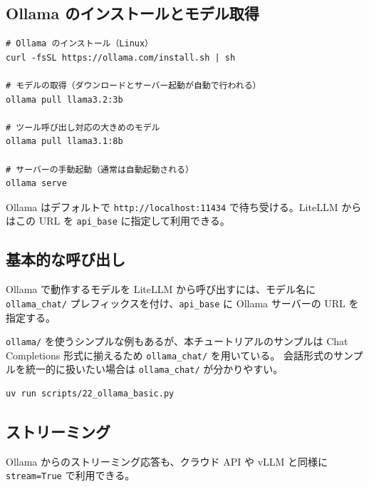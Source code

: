\documentclass[a4paper,11pt]{ltjsarticle}
\newcommand{\code}[1]{\texttt{#1}}
\begin{document}
\subsection{Ollama のインストールとモデル取得}

\begin{lstlisting}[style=bash]
# Ollama のインストール（Linux）
curl -fsSL https://ollama.com/install.sh | sh

# モデルの取得（ダウンロードとサーバー起動が自動で行われる）
ollama pull llama3.2:3b

# ツール呼び出し対応の大きめのモデル
ollama pull llama3.1:8b

# サーバーの手動起動（通常は自動起動される）
ollama serve
\end{lstlisting}

Ollama はデフォルトで \code{http://localhost:11434} で待ち受ける。LiteLLM からはこの URL を \code{api\_base} に指定して利用できる。

\subsection{基本的な呼び出し}
\label{subsec:ollama_basic}

Ollama で動作するモデルを LiteLLM から呼び出すには、モデル名に \code{ollama\_chat/} プレフィックスを付け、\code{api\_base} に Ollama サーバーの URL を指定する。



\begin{notebox}
\code{ollama/} を使うシンプルな例もあるが、本チュートリアルのサンプルは Chat Completions 形式に揃えるため \code{ollama\_chat/} を用いている。
会話形式のサンプルを統一的に扱いたい場合は \code{ollama\_chat/} が分かりやすい。
\end{notebox}

\begin{lstlisting}[style=bash]
uv run scripts/22_ollama_basic.py
\end{lstlisting}

\subsection{ストリーミング}
\label{subsec:ollama_streaming}

Ollama からのストリーミング応答も、クラウド API や vLLM と同様に \code{stream=True} で利用できる。
\end{document}
